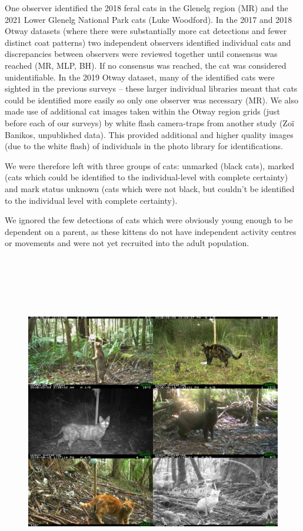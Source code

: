\documentclass[11pt,a4paper,titlepage,twoside,openright]{style/unimelbthesis}
\begin{document}
\begin{mainmatter}
One observer identified the 2018 feral cats in the Glenelg region (MR) and the 2021 Lower Glenelg National Park cats (Luke Woodford). In the 2017 and 2018 Otway datasets (where there were substantially more cat detections and fewer distinct coat patterns) two independent observers identified individual cats and discrepancies between observers were reviewed together until consensus was reached (MR, MLP, BH). If no consensus was reached, the cat was considered unidentifiable. In the 2019 Otway dataset, many of the identified cats were sighted in the previous surveys -- these larger individual libraries meant that cats could be identified more easily so only one observer was necessary (MR). We also made use of additional cat images taken within the Otway region grids (just before each of our surveys) by white flash camera-traps from another study (Zoï Banikos, unpublished data). This provided additional and higher quality images (due to the white flash) of individuals in the photo library for identifications.

We were therefore left with three groups of cats: unmarked (black cats), marked (cats which could be identified to the individual-level with complete certainty) and mark status unknown (cats which were not black, but couldn't be identified to the individual level with complete certainty).

We ignored the few detections of cats which were obviously young enough to be dependent on a parent, as these kittens do not have independent activity centres or movements and were not yet recruited into the adult population.

\newpage

\(~\)

\(~\)

\(~\)
\begin{figure}

{\centering \includegraphics[width=1\linewidth]{figure/c3/cat_coats} 

}
\end{figure}
\end{mainmatter}
\end{document}
